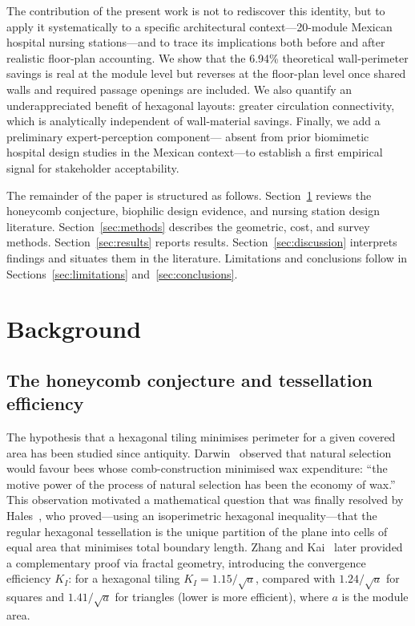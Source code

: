 \documentclass[12pt,a4paper]{article}
\begin{document}
The contribution of the present work is not to rediscover this identity, but to
apply it systematically to a specific architectural context---20-module Mexican
hospital nursing stations---and to trace its implications both before and after
realistic floor-plan accounting.
We show that the 6.94\% theoretical wall-perimeter savings is real at the module
level but reverses at the floor-plan level once shared walls and required passage
openings are included.
We also quantify an underappreciated benefit of hexagonal layouts: greater
circulation connectivity, which is analytically independent of wall-material savings.
Finally, we add a preliminary expert-perception component---
absent from prior biomimetic hospital design studies in the Mexican context---to
establish a first empirical signal for stakeholder acceptability.

The remainder of the paper is structured as follows.
Section~\ref{sec:background} reviews the honeycomb conjecture, biophilic design
evidence, and nursing station design literature.
Section~\ref{sec:methods} describes the geometric, cost, and survey methods.
Section~\ref{sec:results} reports results.
Section~\ref{sec:discussion} interprets findings and situates them in the
literature.
Limitations and conclusions follow in Sections~\ref{sec:limitations}
and~\ref{sec:conclusions}.

\section{Background}
\label{sec:background}

\subsection{The honeycomb conjecture and tessellation efficiency}

The hypothesis that a hexagonal tiling minimises perimeter for a given covered
area has been studied since antiquity.
Darwin~\cite{darwin1859origin} observed that natural selection would favour bees
whose comb-construction minimised wax expenditure: ``the motive power of the
process of natural selection has been the economy of wax.''
This observation motivated a mathematical question that was finally resolved by
Hales~\cite{hales2001honeycomb}, who proved---using an isoperimetric hexagonal
inequality---that the regular hexagonal tessellation is the unique partition of
the plane into cells of equal area that minimises total boundary length.
Zhang and Kai~\cite{zhang2013honeycomb} later provided a complementary proof via
fractal geometry, introducing the convergence efficiency $K_I$: for a hexagonal
tiling $K_I = 1.15/\sqrt{a}$, compared with $1.24/\sqrt{a}$ for squares and
$1.41/\sqrt{a}$ for triangles (lower is more efficient), where $a$ is the
module area.
\end{document}
